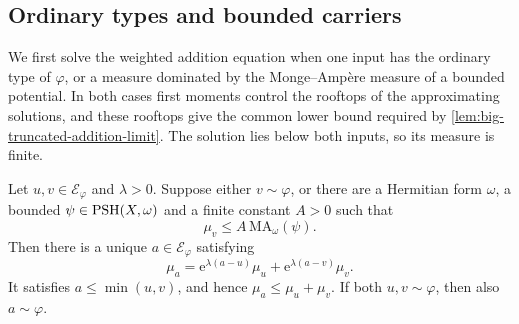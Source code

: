 \subsection{Ordinary types and bounded carriers}
\label{sec:big-weighted-addition}

We first solve the weighted addition equation when one input has the ordinary type of $\varphi$, or a measure dominated by the Monge--Amp\`ere measure of a bounded potential. In both cases first moments control the rooftops of the approximating solutions, and these rooftops give the common lower bound required by \cref{lem:big-truncated-addition-limit}. The solution lies below both inputs, so its measure is finite.

\begin{theorem}\label{thm:big-weighted-addition}
Let $u,v\in\mathcal E_\varphi$ and $\lambda>0$. Suppose either $v\sim\varphi$, or there are a Hermitian form $\omega$, a bounded $\psi\in\mathrm{PSH}(X,\omega)$ and a finite constant $A>0$ such that
\[
 \mu_v\leq A\,\mathrm{MA}_\omega(\psi).
\]
Then there is a unique $a\in\mathcal E_\varphi$ satisfying
\[
 \mu_a=\mathrm{e}^{\lambda(a-u)}\mu_u+\mathrm{e}^{\lambda(a-v)}\mu_v.
\]
It satisfies $a\leq\min(u,v)$, and hence $\mu_a\leq\mu_u+\mu_v$. If both $u,v\sim\varphi$, then also $a\sim\varphi$.
\end{theorem}

